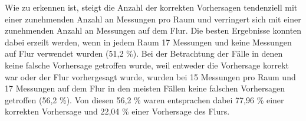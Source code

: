 Wie zu erkennen ist, steigt die Anzahl der korrekten Vorhersagen tendenziell mit einer zunehmenden Anzahl an Messungen pro Raum und verringert sich mit einer zunehmenden Anzahl an Messungen auf dem Flur. Die besten Ergebnisse konnten dabei erzeilt werden, wenn in jedem Raum 17 Messungen und keine Messungen auf Flur verwendet wurden (51,2 \%). Bei der Betrachtung der Fälle in denen keine falsche Vorhersage getroffen wurde, weil entweder die Vorhersage korrekt war oder der Flur vorhergesagt wurde, wurden bei 15 Messungen pro Raum und 17 Messungen auf dem Flur in den meisten Fällen keine falschen Vorhersagen getroffen (56,2 \%). Von diesen 56,2 \% waren entsprachen dabei 77,96 \% einer korrekten Vorhersage und 22,04 \% einer Vorhersage des Flurs.